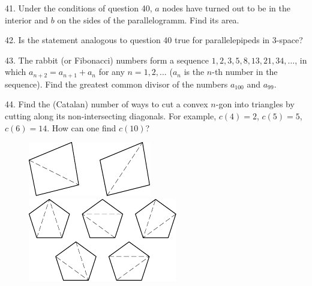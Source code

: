 \begin{problem}{41.}
	Under the conditions of question 40, $a$ nodes have turned out to be in the interior and $b$ on the sides of the parallelogramm. Find its area. 
\end{problem}

\begin{problem}{42.}
	Is the statement analogous to question 40 true for parallelepipeds in 3-space?
\end{problem}

\begin{problem}{43.}
	The rabbit (or Fibonacci) numbers form a sequence $1,2,3,5,8,\allowbreak 13,21,34,\dotsc$, in which $a_{n+2}=a_{n+1}+a_n$ for any
	$n=1,2,\dotsc$ ($a_n$ is the $n$-th number in the sequence). Find the greatest common divisor of the numbers $a_{100}$ and $a_{99}$.
\end{problem}

\begin{problem}{44.}
	Find the (Catalan) number of ways to cut a convex $n$-gon into triangles by cutting along its non-intersecting diagonals. 
	For example, $c(4)=2$, $c(5)=5$, $c(6)=14$. How can one find $c(10)$?
	\begin{figure}
		\includegraphics{taskbook-281}
		\qquad
		\includegraphics{taskbook-282}
	\end{figure}
\end{problem}

